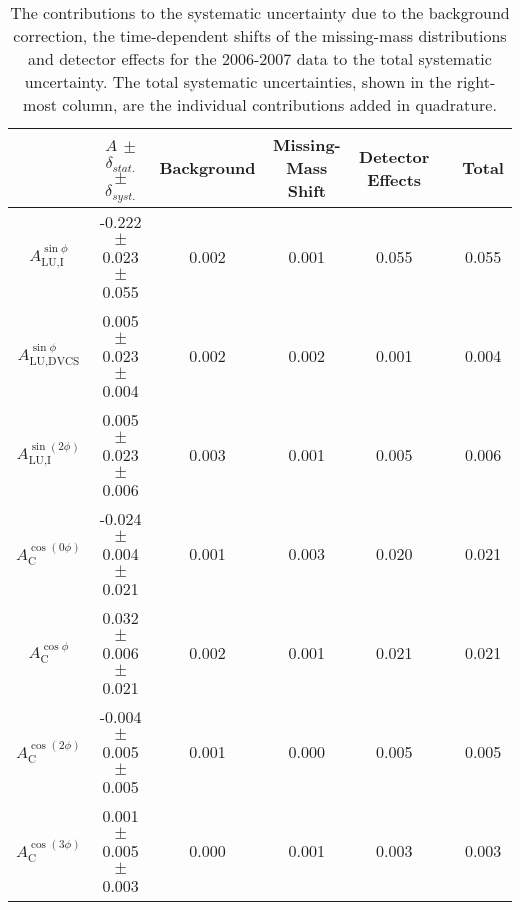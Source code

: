 \begin{table}
 \begin{center}
\resizebox{\textwidth}{!} {
 \begin{tabular}{|c|c|c|c|c|c|c|}
  \hline
 & $A$ $\pm$ $\delta_{stat.}$ $\pm$ $\delta_{syst.}$ & Background & Missing-Mass Shift  & Detector Effects & & Total \\
  \hline
  \hline
  $A_{\textrm{LU,I}}^{\sin\phi}$ & -0.222  $\pm$  0.023  $\pm$   0.055 & 0.002 & 0.001 & 0.055 & & 0.055 \\
  \hline
  $A_{\textrm{LU,DVCS}}^{\sin\phi}$ & 0.005  $\pm$  0.023  $\pm$  0.004 & 0.002 & 0.002 & 0.001 & & 0.004 \\
  \hline
  $A_{\textrm{LU,I}}^{\sin(2\phi)}$ & 0.005  $\pm$  0.023  $\pm$   0.006 & 0.003 & 0.001 & 0.005 & & 0.006 \\
  \hline
  \hline
  $A_{\textrm{C}}^{\cos(0\phi)}$ & -0.024 $\pm$  0.004 $\pm$  0.021 & 0.001 & 0.003 & 0.020 & & 0.021 \\
  \hline
  $A_{\textrm{C}}^{\cos\phi}$ & 0.032  $\pm$  0.006 $\pm$   0.021 & 0.002 & 0.001 & 0.021 & & 0.021 \\
  \hline
  $A_{\textrm{C}}^{\cos(2\phi)}$ & -0.004  $\pm$  0.005  $\pm$   0.005 & 0.001 & 0.000 & 0.005 & & 0.005 \\
  \hline
  $A_{\textrm{C}}^{\cos(3\phi)}$ & 0.001  $\pm$   0.005   $\pm$   0.003 & 0.000 & 0.001 & 0.003 & & 0.003 \\
  \hline
 \end{tabular}
}
  \caption{The contributions to the systematic uncertainty due to the
background correction, the time-dependent shifts of the missing-mass
distributions and detector effects for the 2006-2007 data to the total
systematic uncertainty. The total systematic uncertainties, shown in the
right-most column, are the individual contributions added in quadrature.}
  \label{table_systematic_contributions_0607}
\end{center}
\end{table}

